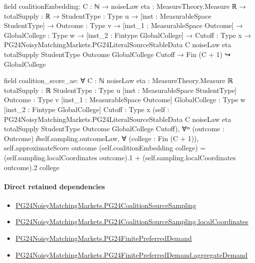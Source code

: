 \documentclass[10pt]{article}
\begin{document}
\begin{ReviewVerbatim}
field coalitionEmbedding:
{C : ℕ} →
  {noiseLaw eta : MeasureTheory.Measure ℝ} →
    {totalSupply : ℝ} →
      {StudentType : Type u} →
        [inst : MeasurableSpace StudentType] →
          {Outcome : Type v} →
            [inst_1 : MeasurableSpace Outcome] →
              {GlobalCollege : Type w} →
                [inst_2 : Fintype GlobalCollege] →
                  {Cutoff : Type x} →
                    PG24NoisyMatchingMarkets.PG24LiteralSourceStableData C noiseLaw eta totalSupply StudentType Outcome
                        GlobalCollege Cutoff →
                      Fin (C + 1) ↪ GlobalCollege

field coalition_score_ae:
∀ {C : ℕ} {noiseLaw eta : MeasureTheory.Measure ℝ} {totalSupply : ℝ} {StudentType : Type u}
  [inst : MeasurableSpace StudentType] {Outcome : Type v} [inst_1 : MeasurableSpace Outcome] {GlobalCollege : Type w}
  [inst_2 : Fintype GlobalCollege] {Cutoff : Type x}
  (self :
    PG24NoisyMatchingMarkets.PG24LiteralSourceStableData C noiseLaw eta totalSupply StudentType Outcome GlobalCollege
      Cutoff),
  ∀ᵐ (outcome : Outcome) ∂self.sampling.outcomeLaw,
    ∀ (college : Fin (C + 1)),
      self.approximateScore outcome (self.coalitionEmbedding college) =
        (self.sampling.localCoordinates outcome).1 + (self.sampling.localCoordinates outcome).2 college
\end{ReviewVerbatim}

\paragraph{Direct retained dependencies}
\begin{itemize}\raggedright
\item \hyperlink{paper-prerequisite-ff3f13051cdbc914}{PG24\allowbreak{}Noisy\allowbreak{}Matching\allowbreak{}Markets.\allowbreak{}PG24\allowbreak{}Coalition\allowbreak{}Source\allowbreak{}Sampling}
\item \hyperlink{governing-declaration-05b0ef210995642f}{PG24\allowbreak{}Noisy\allowbreak{}Matching\allowbreak{}Markets.\allowbreak{}PG24\allowbreak{}Coalition\allowbreak{}Source\allowbreak{}Sampling.\allowbreak{}local\allowbreak{}Coordinates}
\item \hyperlink{governing-declaration-5abddabcc3314102}{PG24\allowbreak{}Noisy\allowbreak{}Matching\allowbreak{}Markets.\allowbreak{}PG24\allowbreak{}Finite\allowbreak{}Preferred\allowbreak{}Demand}
\item \hyperlink{governing-declaration-43725eb4baa1b4b7}{PG24\allowbreak{}Noisy\allowbreak{}Matching\allowbreak{}Markets.\allowbreak{}PG24\allowbreak{}Finite\allowbreak{}Preferred\allowbreak{}Demand.\allowbreak{}aggregate\allowbreak{}Demand}
\end{itemize}
\hypertarget{governing-declaration-908406134a9242b1}{}
\end{document}
